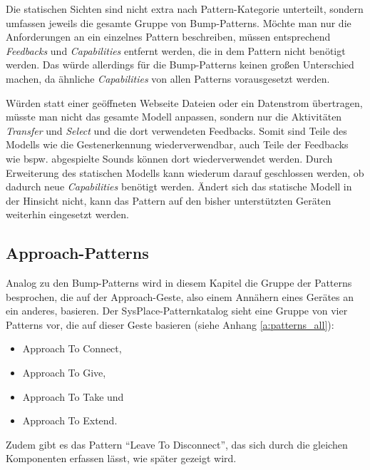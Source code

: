 Die statischen Sichten sind nicht extra nach Pattern-Kategorie unterteilt, sondern umfassen jeweils die gesamte Gruppe von Bump-Patterns. Möchte man nur die Anforderungen an ein einzelnes Pattern beschreiben, müssen entsprechend \textit{Feedbacks} und \textit{Capabilities} entfernt werden, die in dem Pattern nicht benötigt werden. Das würde allerdings für die Bump-Patterns keinen großen Unterschied machen, da ähnliche \textit{Capabilities} von allen Patterns vorausgesetzt werden.

Würden statt einer geöffneten Webseite Dateien oder ein Datenstrom übertragen, müsste man nicht das gesamte Modell anpassen, sondern nur die Aktivitäten \textit{Transfer} und \textit{Select} und die dort verwendeten Feedbacks. Somit sind Teile des Modells wie die Gestenerkennung wiederverwendbar, auch Teile der Feedbacks wie bspw. abgespielte Sounds können dort wiederverwendet werden. Durch Erweiterung des statischen Modells kann wiederum darauf geschlossen werden, ob dadurch neue \textit{Capabilities} benötigt werden. Ändert sich das statische Modell in der Hinsicht nicht, kann das Pattern auf den bisher unterstützten Geräten weiterhin eingesetzt werden.

\subsection{Approach-Patterns}
\label{subsec:approach_validation}
Analog zu den Bump-Patterns wird in diesem Kapitel die Gruppe der Patterns besprochen, die auf der Approach-Geste, also einem Annähern eines Gerätes an ein anderes, basieren. Der SysPlace-Patternkatalog sieht eine Gruppe von vier Patterns vor, die auf dieser Geste basieren (siehe Anhang \ref{a:patterns_all}):
\begin{itemize}
\item Approach To Connect,
\item Approach To Give,
\item Approach To Take und
\item Approach To Extend.
\end{itemize}
Zudem gibt es das Pattern "`Leave To Disconnect"', das sich durch die gleichen Komponenten erfassen lässt, wie später gezeigt wird.

